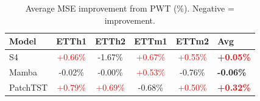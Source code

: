\begin{table}[t]
\centering
\caption{Average MSE improvement from PWT (\%). Negative = improvement.}
\label{tab:pwt_summary}
\begin{tabular}{lcccc}
\toprule
Model & ETTh1 & ETTh2 & ETTm1 & ETTm2 & Avg \\
\midrule
S4 & \textcolor{red}{+0.66\%} & \textcolor{green!50!black}{-1.67\%} & \textcolor{red}{+0.67\%} & \textcolor{red}{+0.55\%} & \textcolor{red}{\textbf{+0.05\%}} \\
Mamba & \textcolor{green!50!black}{-0.02\%} & \textcolor{green!50!black}{-0.00\%} & \textcolor{red}{+0.53\%} & \textcolor{green!50!black}{-0.76\%} & \textcolor{green!50!black}{\textbf{-0.06\%}} \\
PatchTST & \textcolor{red}{+0.79\%} & \textcolor{red}{+0.69\%} & \textcolor{green!50!black}{-0.68\%} & \textcolor{red}{+0.50\%} & \textcolor{red}{\textbf{+0.32\%}} \\
\bottomrule
\end{tabular}
\end{table}